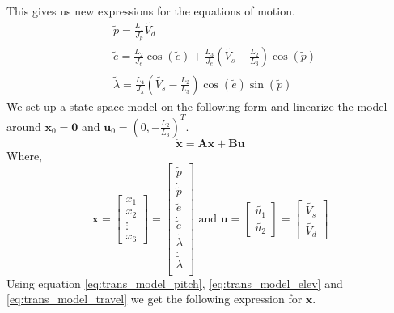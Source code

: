 This gives us new expressions for the equations of motion.
\begin{subequations}
    \begin{align}
        & \ddot{\tilde{p}} = \frac{L_1}{J_p} \tilde{V_d} \label{eq:trans_model_pitch}\\
        & \ddot{\tilde{e}} = \frac{L_2}{J_e} \cos(\tilde{e}) + \frac{L_3}{J_e}(\tilde{V_s} - \frac{L_2}{L_3}) \cos(\tilde{p})\label{eq:trans_model_elev} \\
        & \ddot{\tilde{\lambda}} = \frac{L_4}{J_\lambda } (\tilde{V_s}-\frac{L_2}{L_3}) \cos(\tilde{e}) \sin(\tilde{p})\label{eq:trans_model_travel}
    \end{align}
\end{subequations}
We set up a state-space model on the following form and linearize the model around $\mathbf{x}_0 = \mathbf{0}$ and $\mathbf{u}_0 = (0, -\frac{L_2}{L_3})^T$.
\begin{equation*}
    \mathbf{\dot{x}} = \mathbf{Ax} + \mathbf{Bu}
\end{equation*}
Where, 
\begin{equation*}
    \mathbf{x} = 
    \begin{bmatrix}
        x_1 \\ x_2 \\ \vdots \\ x_6
    \end{bmatrix}
    =
    \begin{bmatrix}
        \tilde{p} \\ \dot{\tilde{p}} \\ \tilde{e} \\ \dot{\tilde{e}} \\ \tilde{\lambda} \\ \dot{\tilde{\lambda}} \\ 
    \end{bmatrix}
    \text{ and }
    \mathbf{u} =
    \begin{bmatrix}
        \tilde{u_1} \\ \tilde{u_2}
    \end{bmatrix}
    =
    \begin{bmatrix}
        \tilde{V_s} \\ \tilde{V_d}
    \end{bmatrix}
\end{equation*}
Using equation \eqref{eq:trans_model_pitch}, \eqref{eq:trans_model_elev} and \eqref{eq:trans_model_travel} we get the following expression for $\mathbf{\dot{x}}$.

